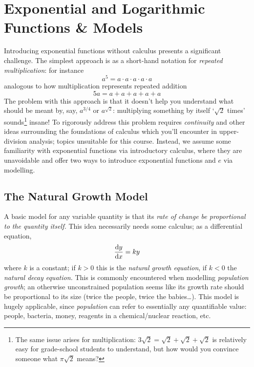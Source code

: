 
\graphicspath{{3exp/asy/}}

\section{Exponential and Logarithmic Functions \& Models}

Introducing exponential functions without calculus presents a significant challenge. The simplest approach is as a short-hand notation for \emph{repeated multiplication}: for instance
\[a^5=a\cdot a\cdot a\cdot a\cdot a\]
analogous to how multiplication represents repeated addition
\[5a=a+a+a+a+a\]
The problem with this approach is that it doesn't help you understand what should be meant by, say, $a^{3/4}$ or $a^{\sqrt 2}$: multiplying something by itself `$\sqrt 2$ times' sounds\footnote{The same issue arises for multiplication: $3\sqrt 2=\sqrt 2+\sqrt 2+\sqrt 2$ is relatively easy for grade-school students to understand, but how would you convince someone what $\pi\sqrt 2$ means?} insane!\smallbreak
To rigorously address this problem requires \emph{continuity} and other ideas surrounding the foundations of calculus which you'll encounter in upper-division analysis; topics unsuitable for this course. Instead, we assume some familiarity with exponential functions via introductory calculus, where they are unavoidable and offer two ways to introduce exponential functions and $e$ via modelling.

\subsection{The Natural Growth Model}

A basic model for any variable quantity is that its \emph{rate of change be proportional to the quantity itself.} This idea necessarily needs some calculus; as a differential equation,
\[\diff[y]{x}=ky\]
where $k$ is a constant; if $k>0$ this is the \emph{natural growth equation}, if $k<0$ the \emph{natural decay equation.} This is commonly encountered when modelling \emph{population growth}; an otherwise unconstrained population seems like its growth rate should be proportional to its size (twice the people, twice the babies\ldots). This model is hugely applicable, since \emph{population} can refer to essentially any quantifiable value: people, bacteria, money, reagents in a chemical/nuclear reaction, etc.\medbreak
% 

